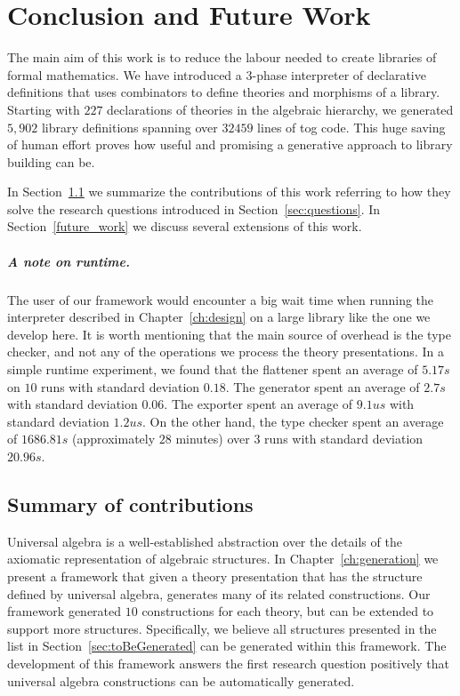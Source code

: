 \chapter{Conclusion and Future Work}
\label{ch:conclusion}

The main aim of this work is to reduce the labour needed to create libraries of formal mathematics. We have introduced a $3$-phase interpreter of declarative definitions that uses combinators to define theories and morphisms of a library. Starting with $227$ declarations of theories in the algebraic hierarchy, we generated $5,902$ library definitions spanning over $32459$ lines of tog code. 
This huge saving of human effort proves how useful and promising a generative approach to library building can be.  

In Section~\ref{conc:summary} we summarize the contributions of this work referring to how they solve the research questions introduced in Section~\ref{sec:questions}. In Section~\ref{future_work} we discuss several extensions of this work. 

\paragraph{A note on runtime.} The user of our framework would encounter a big wait time when running the interpreter described in Chapter~\ref{ch:design} on a large library like the one we develop here. It is worth mentioning that the main source of overhead is the type checker, and not any of the operations we process the theory presentations. In a simple runtime experiment, we found that the flattener spent an average of $5.17 s$ on $10$ runs with standard deviation $0.18$. The generator spent an average of $2.7 s$ with standard deviation $0.06$. The exporter spent an average of $9.1 us$ with standard deviation $1.2 us$. On the other hand, the type checker spent an average of $1686.81s$ (approximately $28$ minutes) over $3$ runs with standard deviation $20.96s$.


\section{Summary of contributions}
\label{conc:summary}
Universal algebra is a well-established abstraction over the details of the axiomatic representation of algebraic structures. In Chapter~\ref{ch:generation} we present a framework that given a theory presentation that has the structure defined by universal algebra, generates many of its related constructions. Our framework generated $10$ constructions for each theory, but can be extended to support more structures. Specifically, we believe all structures presented in the list in Section~\ref{sec:toBeGenerated} can be generated within this framework. The development of this framework answers the first research question positively that universal algebra constructions can be automatically generated. 


